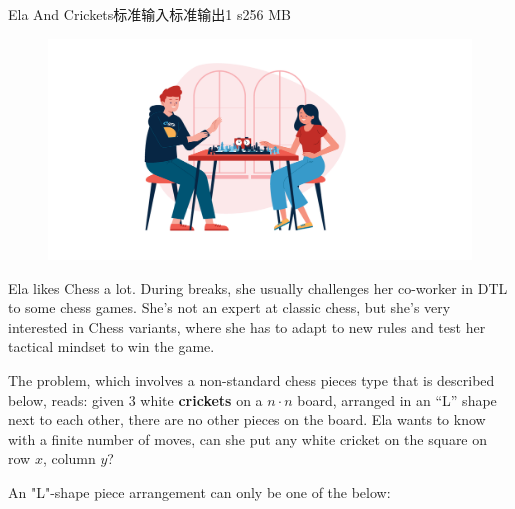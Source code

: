 \begin{problem}{Ela And Crickets}{标准输入}{标准输出}{1 s}{256 MB}
\begin{figure}
\includegraphics[width=\linewidth]{problems/assets/ela1.png}
\end{figure}

Ela likes Chess a lot. During breaks, she usually challenges her co-worker in DTL to some chess games. She's not an expert at classic chess, but she's very interested in Chess variants, where she has to adapt to new rules and test her tactical mindset to win the game.

The problem, which involves a non-standard chess pieces type that is described below, reads: given $3$ white \textbf{crickets} on a $n \cdot n$ board, arranged in an ``L'' shape next to each other, there are no other pieces on the board. Ela wants to know with a finite number of moves, can she put any white cricket on the square on row $x$, column $y$?

An "L"-shape piece arrangement can only be one of the below:


\end{problem}
